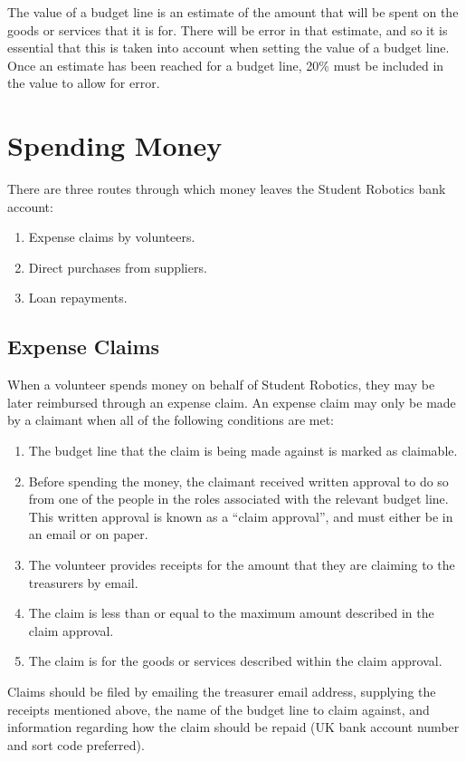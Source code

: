 The value of a budget line is an estimate of the amount that will be spent on the goods or services that it is for.  There will be error in that estimate, and so it is essential that this is taken into account when setting the value of a budget line.  Once an estimate has been reached for a budget line, 20\% must be included in the value to allow for error. 


\section{Spending Money}

There are three routes through which money leaves the Student Robotics bank account:

\begin{enumerate}
\item Expense claims by volunteers.
\item Direct purchases from suppliers.
\item Loan repayments.
\end{enumerate}

\subsection{Expense Claims}

When a volunteer spends money on behalf of Student Robotics, they may be later reimbursed through an expense claim.  An expense claim may only be made by a claimant when all of the following conditions are met:

\begin{enumerate}
\item The budget line that the claim is being made against is marked as claimable.
\item Before spending the money, the claimant received written approval to do so from one of the people in the roles associated with the relevant budget line.  This written approval is known as a ``claim approval'', and must either be in an email or on paper.
\item The volunteer provides receipts for the amount that they are claiming to the treasurers by email.
\item The claim is less than or equal to the maximum amount described in the claim approval.
\item The claim is for the goods or services described within the claim approval.
\end{enumerate}

Claims should be filed by emailing the treasurer email address, supplying the receipts mentioned above, the name of the budget line to claim against, and information regarding how the claim should be repaid (UK bank account number and sort code preferred).

